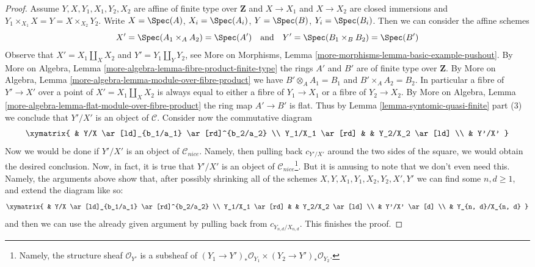 \begin{proof}
\medskip\noindent
Assume $Y, X, Y_1, X_1, Y_2, X_2$ are affine of finite type over
$\mathbf{Z}$ and $X \to X_1$ and $X \to X_2$ are closed immersions
and $Y_1 \times_{X_1} X = Y = X \times_{X_2} Y_2$.
Write $X = \Spec(A)$, $X_i = \Spec(A_i)$, $Y = \Spec(B)$,
$Y_i = \Spec(B_i)$. Then we can consider the affine schemes
$$
X' = \Spec(A_1 \times_A A_2) = \Spec(A')
\quad\text{and}\quad
Y' = \Spec(B_1 \times_B B_2) = \Spec(B')
$$
Observe that $X' = X_1 \amalg_X X_2$ and $Y' = Y_1 \amalg_Y Y_2$, see
More on Morphisms, Lemma \ref{more-morphisms-lemma-basic-example-pushout}.
By More on Algebra, Lemma \ref{more-algebra-lemma-fibre-product-finite-type}
the rings $A'$ and $B'$ are of finite type over $\mathbf{Z}$. By
More on Algebra, Lemma \ref{more-algebra-lemma-module-over-fibre-product}
we have $B' \otimes_A A_1 = B_1$ and $B' \times_A A_2 = B_2$.
In particular a fibre of $Y' \to X'$ over a point of
$X' = X_1 \amalg_X X_2$ is always equal to either a fibre of $Y_1 \to X_1$
or a fibre of $Y_2 \to X_2$. By More on Algebra, Lemma
\ref{more-algebra-lemma-flat-module-over-fibre-product}
the ring map $A' \to B'$ is flat. Thus by
Lemma \ref{lemma-syntomic-quasi-finite} part (3)
we conclude that $Y'/X'$ is an object of $\mathcal{C}$.
Consider now the commutative diagram
$$
\xymatrix{
& Y/X \ar[ld]_{b_1/a_1} \ar[rd]^{b_2/a_2} \\
Y_1/X_1 \ar[rd] & & Y_2/X_2 \ar[ld] \\
& Y'/X'
}
$$
Now we would be done if $Y'/X'$ is an object of $\mathcal{C}_{nice}$.
Namely, then pulling back $c_{Y'/X'}$ around the two sides of the
square, we would obtain the desired conclusion. Now, in fact, it
is true that $Y'/X'$ is an object of
$\mathcal{C}_{nice}$\footnote{Namely, the structure
sheaf $\mathcal{O}_{Y'}$ is a subsheaf of
$(Y_1 \to Y')_*\mathcal{O}_{Y_1} \times (Y_2 \to Y')_*\mathcal{O}_{Y_2}$.}.
But it is amusing to note that we don't even need this.
Namely, the arguments above show that,
after possibly shrinking all of the schemes
$X, Y, X_1, Y_1, X_2, Y_2, X', Y'$ we can find some
$n, d \geq 1$, and extend the diagram like so:
$$
\xymatrix{
& Y/X \ar[ld]_{b_1/a_1} \ar[rd]^{b_2/a_2} \\
Y_1/X_1 \ar[rd] & & Y_2/X_2 \ar[ld] \\
& Y'/X' \ar[d] \\
& Y_{n, d}/X_{n, d}
}
$$
and then we can use the already given argument by pulling
back from $c_{Y_{n, d}/X_{n, d}}$. This finishes the proof.
\end{proof}













